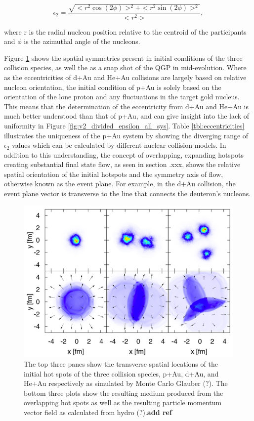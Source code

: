 \begin{equation}
\epsilon_2 = \frac{\sqrt{<r^2 \cos(2\phi)>^2+<r^2 \sin(2\phi)>^2}}{<r^2>},
\end{equation}

where r is the radial nucleon position relative to the centroid of the participants and $\phi$ is the azimuthal angle of the nucleons.

Figure  \ref{fig:initial_condition_comparison}  shows the spatial symmetries present in initial conditions of the three collision species, as well the as a snap shot of the QGP in mid-evolution.  Where as the eccentricities of d+Au and He+Au collisions are largely based on relative nucleon orientation, the initial condition of p+Au is solely based on the orientation of the lone proton and any fluctuations in the target gold nucleus. This means that the determination of the eccentricity from d+Au and He+Au is much better understood than that of p+Au, and can give insight into the lack of uniformity in Figure \ref{fig:v2_divided_epsilon_all_sys}. Table \ref{tbl:eccentricities} illustrates the uniqueness of the p+Au system by showing the diverging range of $\epsilon_2$ values which can be calculated by different nuclear collision models. In addition to this understanding, the concept of overlapping, expanding hotspots creating substantial final state flow, as seen in section .xxx, shows the relative spatial orientation of the initial hotspots and the symmetry axis of flow, otherwise known as the event plane. For example, in the d+Au collision, the event plane vector is transverse to the line that connects the deuteron's nucleons. 

\begin{figure}[!ht]
\begin{center}
\includegraphics[width=0.75\linewidth]{figs/initial_condition_comparison.png}
\caption{The top three panes show the transverse spatial locations of the initial hot spots of the three collision species, p+Au, d+Au, and He+Au respectively as simulated by Monte Carlo Glauber (?). The bottom three plots show the resulting medium produced from the overlapping hot spots as well as the resulting particle momentum vector field as calculated from hydro (?).\textbf{add ref}}
\label{fig:initial_condition_comparison}
\end{center}
\end{figure}

